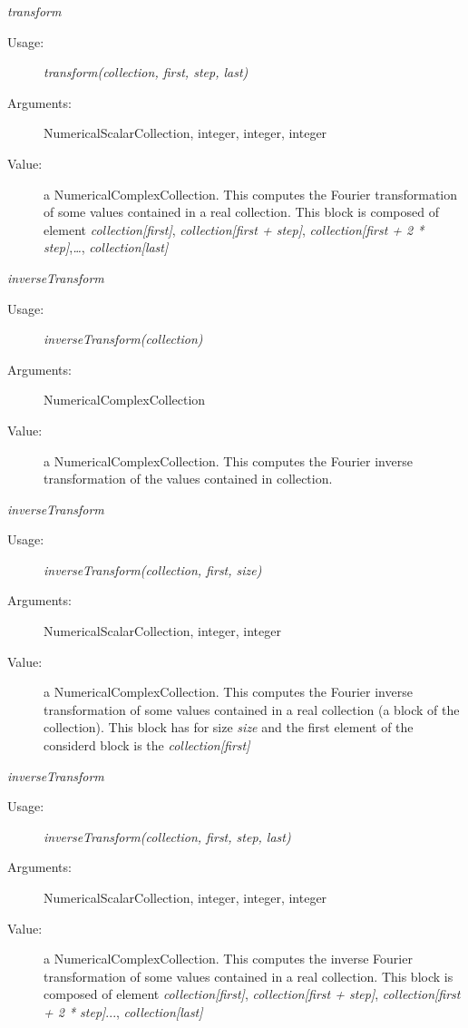 \begin{description}
\item \textit{transform}
\begin{description}
\item[Usage:] \textit{transform(collection, first, step, last)}
\item[Arguments:] NumericalScalarCollection, integer, integer, integer
\item[Value:] a NumericalComplexCollection. This computes the Fourier transformation of some values contained in a real collection.
This block is composed of element \textit{collection[first]}, \textit{collection[first + step]}, \textit{collection[first + 2 * step]},\textit{\ldots}, \textit{collection[last]}
\end{description}
\bigskip

\item \textit{inverseTransform}
\begin{description}
\item[Usage:] \textit{inverseTransform(collection)}
\item[Arguments:] NumericalComplexCollection
\item[Value:] a NumericalComplexCollection. This computes the Fourier inverse transformation of the values contained in collection.
\end{description}
\bigskip

\item \textit{inverseTransform}
\begin{description}
\item[Usage:] \textit{inverseTransform(collection, first, size)}
\item[Arguments:] NumericalScalarCollection, integer, integer
\item[Value:] a NumericalComplexCollection. This computes the Fourier inverse transformation of some values contained in a real collection (a block of the collection).
This block has for size \textit{size} and the first element of the considerd block is the \textit{collection[first]}
\end{description}
\bigskip

\item \textit{inverseTransform}
\begin{description}
\item[Usage:] \textit{inverseTransform(collection, first, step, last)}
\item[Arguments:] NumericalScalarCollection, integer, integer, integer
\item[Value:] a NumericalComplexCollection. This computes the inverse Fourier transformation of some values contained in a real collection.
This block is composed of element \textit{collection[first]}, \textit{collection[first + step]}, \textit{collection[first + 2 * step]}..., \textit{collection[last]}
\end{description}
\bigskip


\end{description}
